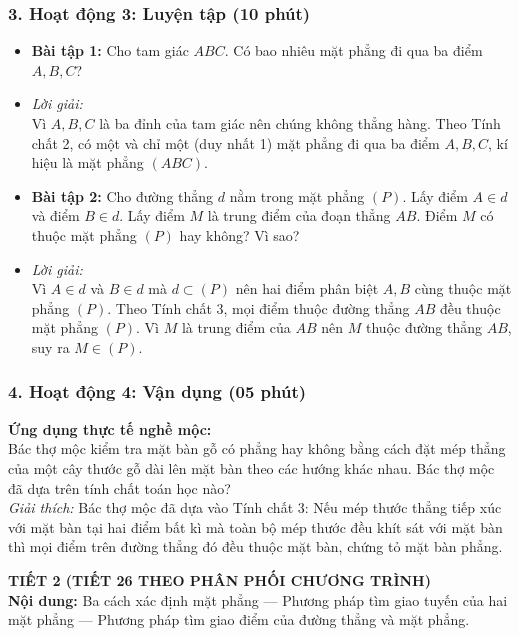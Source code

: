 \documentclass[12pt, a4paper]{article}
\begin{document}
\subsubsection*{3. Hoạt động 3: Luyện tập (10 phút)}
\begin{itemize}
    \item \textbf{Bài tập 1:} Cho tam giác $ABC$. Có bao nhiêu mặt phẳng đi qua ba điểm $A, B, C$?
    \item \textit{Lời giải:}\\
    Vì $A, B, C$ là ba đỉnh của tam giác nên chúng không thẳng hàng. Theo Tính chất 2, có một và chỉ một (duy nhất 1) mặt phẳng đi qua ba điểm $A, B, C$, kí hiệu là mặt phẳng $(ABC)$.
    \item \textbf{Bài tập 2:} Cho đường thẳng $d$ nằm trong mặt phẳng $(P)$. Lấy điểm $A \in d$ và điểm $B \in d$. Lấy điểm $M$ là trung điểm của đoạn thẳng $AB$. Điểm $M$ có thuộc mặt phẳng $(P)$ hay không? Vì sao?
    \item \textit{Lời giải:}\\
    Vì $A \in d$ và $B \in d$ mà $d \subset (P)$ nên hai điểm phân biệt $A, B$ cùng thuộc mặt phẳng $(P)$. Theo Tính chất 3, mọi điểm thuộc đường thẳng $AB$ đều thuộc mặt phẳng $(P)$. Vì $M$ là trung điểm của $AB$ nên $M$ thuộc đường thẳng $AB$, suy ra $M \in (P)$.
\end{itemize}

\subsubsection*{4. Hoạt động 4: Vận dụng (05 phút)}
\textbf{Ứng dụng thực tế nghề mộc:}\\
Bác thợ mộc kiểm tra mặt bàn gỗ có phẳng hay không bằng cách đặt mép thẳng của một cây thước gỗ dài lên mặt bàn theo các hướng khác nhau. Bác thợ mộc đã dựa trên tính chất toán học nào?\\
\textit{Giải thích:} Bác thợ mộc đã dựa vào Tính chất 3: Nếu mép thước thẳng tiếp xúc với mặt bàn tại hai điểm bất kì mà toàn bộ mép thước đều khít sát với mặt bàn thì mọi điểm trên đường thẳng đó đều thuộc mặt bàn, chứng tỏ mặt bàn phẳng.

\newpage

{\large \textbf{TIẾT 2 (TIẾT 26 THEO PHÂN PHỐI CHƯƠNG TRÌNH)}}\\[0.3em]
\textbf{Nội dung:} Ba cách xác định mặt phẳng --- Phương pháp tìm giao tuyến của hai mặt phẳng --- Phương pháp tìm giao điểm của đường thẳng và mặt phẳng.
\end{document}
